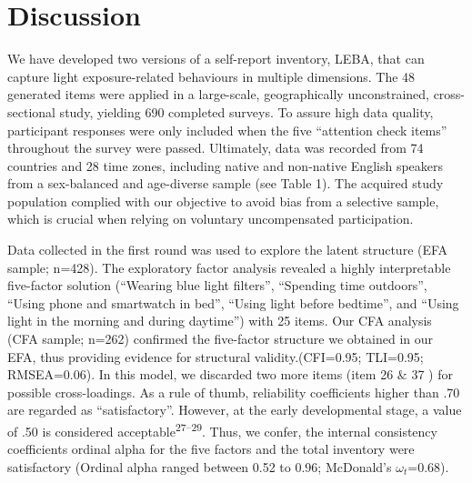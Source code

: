 \documentclass[
  man]{apa6}
\begin{document}
\hypertarget{discussion}{%
\section{Discussion}\label{discussion}}

We have developed two versions of a self-report inventory, LEBA, that can capture light exposure-related behaviours in multiple dimensions. The 48 generated items were applied in a large-scale, geographically unconstrained, cross-sectional study, yielding 690 completed surveys. To assure high data quality, participant responses were only included when the five ``attention check items'' throughout the survey were passed. Ultimately, data was recorded from 74 countries and 28 time zones, including native and non-native English speakers from a sex-balanced and age-diverse sample (see Table 1). The acquired study population complied with our objective to avoid bias from a selective sample, which is crucial when relying on voluntary uncompensated participation.

Data collected in the first round was used to explore the latent structure (EFA sample; n=428). The exploratory factor analysis revealed a highly interpretable five-factor solution (``Wearing blue light filters'', ``Spending time outdoors'', ``Using phone and smartwatch in bed'', ``Using light before bedtime'', and ``Using light in the morning and during daytime'') with 25 items. Our CFA analysis (CFA sample; n=262) confirmed the five-factor structure we obtained in our EFA, thus providing evidence for structural validity.(CFI=0.95; TLI=0.95; RMSEA=0.06). In this model, we discarded two more items (item 26 \(\&\) 37 ) for possible cross-loadings. As a rule of thumb, reliability coefficients higher than .70 are regarded as ``satisfactory''. However, at the early developmental stage, a value of .50 is considered acceptable\textsuperscript{27--29}. Thus, we confer, the internal consistency coefficients ordinal alpha for the five factors and the total inventory were satisfactory (Ordinal alpha ranged between 0.52 to 0.96; McDonald's \(\omega_t\)=0.68).
\end{document}
